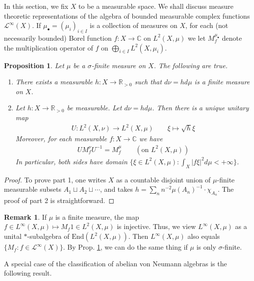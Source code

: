 \documentclass[12pt,b5paper,notitlepage]{article}
\theoremstyle{definition}
\newtheorem{rem}[df]{Remark}
\theoremstyle{plain}
\newtheorem{pp}[df]{Proposition}
\newcommand{\mc}{\mathcal}
\newcommand{\End}{\mathrm{End}} %
\newcommand{\blt}{\bullet}
\newcommand{\Cbb}{\mathbb C}
\newcommand{\Rbb}{\mathbb R}
\numberwithin{equation}{section}
\begin{document}
In this section, we fix $X$ to be a measurable space. We shall discuss measure theoretic representations of the algebra of bounded measurable complex functions $\mc L^\infty(X)$. If $\mu_\blt=(\mu_i)_{i\in I}$ is a collection of measures on $X$, for each (not necessarily bounded) Borel function $f:X\rightarrow\Cbb$ on $L^2(X,\mu)$ we let $M^{\mu_\blt}_f$ denote the multiplication operator of $f$ on $\bigoplus_{i\in I}L^2(X,\mu_i)$. 





\begin{pp}\label{lb90}
Let $\mu$ be a $\sigma$-finite measure on $X$. The following are true.
\begin{enumerate}
\item There exists a measurable $h:X\rightarrow\Rbb_{>0}$ such that $d\nu=hd\mu$ is a finite measure on $X$.
\item Let $h:X\rightarrow\Rbb_{>0}$ be measurable. Let $d\nu=hd\mu$. Then there is a unique unitary map
\begin{align*}
U:L^2(X,\nu)\rightarrow L^2(X,\mu)\qquad \xi\mapsto\sqrt h\xi
\end{align*}
Moreover, for each measurable $f:X\rightarrow\Cbb$ we have
\begin{align*}
UM_f^\nu U^{-1}=M_f^\mu\qquad(\text{on }L^2(X,\mu))
\end{align*}
In particular, both sides have domain $\{\xi\in L^2(X,\mu): \int_X |f\xi|^2d\mu<+\infty\}$.
\end{enumerate}
\end{pp}



\begin{proof}
To prove part 1, one writes $X$ as a countable disjoint union of $\mu$-finite measurable subsets $A_1\sqcup A_2\sqcup\cdots$, and takes $h=\sum_n n^{-2}\mu(A_n)^{-1}\cdot\chi_{A_n}$. The proof of part 2 is straightforward.
\end{proof}


\begin{rem}
If $\mu$ is a finite measure, the map $f\in L^\infty(X,\mu)\mapsto M_f1\in L^2(X,\mu)$ is injective. Thus, we view $L^\infty(X,\mu)$ as a unital $*$-subalgebra of $\End(L^2(X,\mu))$. Then $L^\infty(X,\mu)$ also equals $\{M_f:f\in\mc L^\infty(X)\}$. By Prop. \ref{lb90}, we can do the same thing if $\mu$ is only $\sigma$-finite.
\end{rem}


A special case of the classification of abelian von Neumann algebras is the following result.
\end{document}
